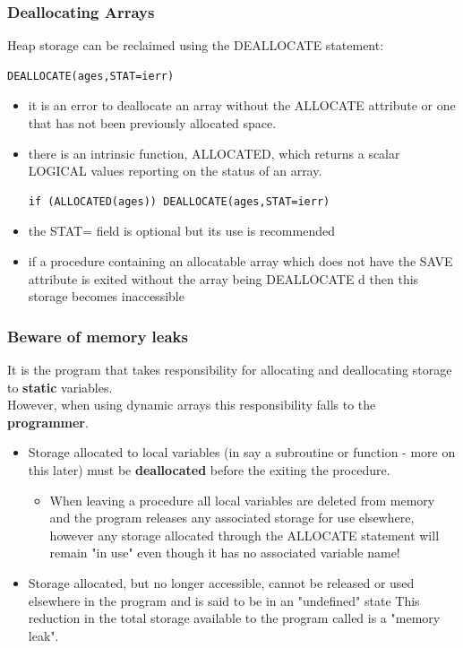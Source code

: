 \documentclass[11pt]{beamer}
\begin{document}
\begin{frame}[fragile]
\frametitle{Deallocating Arrays}

\footnotesize{
Heap storage can be reclaimed using the DEALLOCATE statement:
 \begin{lstlisting}[style=Fortran]
DEALLOCATE(ages,STAT=ierr)
 \end{lstlisting}

\begin{itemize}
\item it is an error to deallocate an array without the ALLOCATE attribute or one that has not been previously allocated space.
\item there is an intrinsic function, ALLOCATED, which returns a scalar LOGICAL values reporting on the status of an array. \\
 \begin{lstlisting}[style=Fortran]
if (ALLOCATED(ages)) DEALLOCATE(ages,STAT=ierr)
 \end{lstlisting}

\item the STAT= field is optional but its use is recommended
\item if a procedure containing an allocatable array which does not have the SAVE attribute is exited without the array being DEALLOCATE d then this storage becomes inaccessible
 \end{itemize}
}

\end{frame}

\begin{frame}[fragile]
\frametitle{Beware of memory leaks}

It is the program that takes responsibility for allocating and deallocating storage to \textbf{static} variables.\\
However, when using dynamic arrays this responsibility falls to the \textbf{programmer}. 

\begin{itemize}
\item Storage allocated to local variables (in say a subroutine or function - more on this later) must be \textbf{deallocated} before the exiting the procedure. 
\begin{itemize}
\item When leaving a procedure all local variables are deleted from memory and the program releases any associated storage for use elsewhere, however any storage allocated through the ALLOCATE statement will remain "in use" even though it has no associated variable name!
 \end{itemize}
\item Storage allocated, but no longer accessible, cannot be released or used elsewhere in the program and is said to be in an "undefined" state This reduction in the total storage available to the program called is a "memory leak".
 \end{itemize}


\end{frame}
\end{document}
